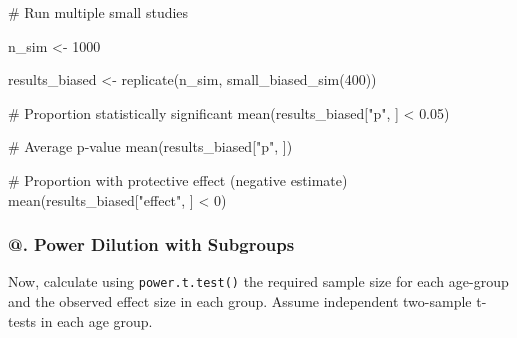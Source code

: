 \documentclass[
  letterpaper,
  DIV=11,
  numbers=noendperiod]{scrartcl}
\newenvironment{Shaded}{\begin{snugshade}}{\end{snugshade}}
\newcommand{\AttributeTok}[1]{\textcolor[rgb]{0.40,0.45,0.13}{#1}}
\newcommand{\CommentTok}[1]{\textcolor[rgb]{0.37,0.37,0.37}{#1}}
\newcommand{\DecValTok}[1]{\textcolor[rgb]{0.68,0.00,0.00}{#1}}
\newcommand{\DocumentationTok}[1]{\textcolor[rgb]{0.37,0.37,0.37}{\textit{#1}}}
\newcommand{\FloatTok}[1]{\textcolor[rgb]{0.68,0.00,0.00}{#1}}
\newcommand{\FunctionTok}[1]{\textcolor[rgb]{0.28,0.35,0.67}{#1}}
\newcommand{\NormalTok}[1]{\textcolor[rgb]{0.00,0.23,0.31}{#1}}
\newcommand{\OtherTok}[1]{\textcolor[rgb]{0.00,0.23,0.31}{#1}}
\newcommand{\SpecialCharTok}[1]{\textcolor[rgb]{0.37,0.37,0.37}{#1}}
\newcommand{\StringTok}[1]{\textcolor[rgb]{0.13,0.47,0.30}{#1}}
\begin{document}
\begin{Shaded}
\begin{Highlighting}[]
\CommentTok{\# Run multiple small studies}

\NormalTok{n\_sim }\OtherTok{\textless{}{-}} \DecValTok{1000}

\NormalTok{results\_biased }\OtherTok{\textless{}{-}} \FunctionTok{replicate}\NormalTok{(n\_sim, }\FunctionTok{small\_biased\_sim}\NormalTok{(}\DecValTok{400}\NormalTok{))}

\CommentTok{\# Proportion statistically significant}
\FunctionTok{mean}\NormalTok{(results\_biased[}\StringTok{"p"}\NormalTok{, ] }\SpecialCharTok{\textless{}} \FloatTok{0.05}\NormalTok{)}

\CommentTok{\# Average p{-}value}
\FunctionTok{mean}\NormalTok{(results\_biased[}\StringTok{"p"}\NormalTok{, ])}

\CommentTok{\# Proportion with protective effect (negative estimate)}
\FunctionTok{mean}\NormalTok{(results\_biased[}\StringTok{"effect"}\NormalTok{, ] }\SpecialCharTok{\textless{}} \DecValTok{0}\NormalTok{)}
\end{Highlighting}
\end{Shaded}

\subsubsection{@. Power Dilution with
Subgroups}\label{power-dilution-with-subgroups}

Now, calculate using \texttt{power.t.test()} the required sample size
for each age-group and the observed effect size in each group. Assume
independent two-sample t-tests in each age group.

\begin{Shaded}
\end{Shaded}
\end{document}
